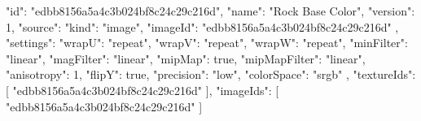 {
  "id": "edbb8156a5a4c3b024bf8c24c29c216d",
  "name": "Rock Base Color",
  "version": 1,
  "source": {
    "kind": "image",
    "imageId": "edbb8156a5a4c3b024bf8c24c29c216d"
  },
  "settings": {
    "wrapU": "repeat",
    "wrapV": "repeat",
    "wrapW": "repeat",
    "minFilter": "linear",
    "magFilter": "linear",
    "mipMap": true,
    "mipMapFilter": "linear",
    "anisotropy": 1,
    "flipY": true,
    "precision": "low",
    "colorSpace": "srgb"
  },
  "textureIds": [
    "edbb8156a5a4c3b024bf8c24c29c216d"
  ],
  "imageIds": [
    "edbb8156a5a4c3b024bf8c24c29c216d"
  ]
}
